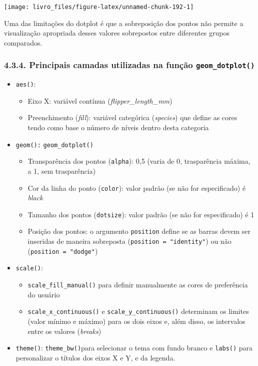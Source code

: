 \documentclass[
]{book}
\begin{document}
\begin{center}\texttt{[image: livro\_files/figure-latex/unnamed-chunk-192-1]} \end{center}

Uma das limitações do dotplot é que a sobreposição dos pontos não permite a visualização apropriada desses valores sobrepostos entre diferentes grupos comparados.

\hypertarget{principais-camadas-utilizadas-na-funuxe7uxe3o-geom_dotplot}{%
\subsubsection{\texorpdfstring{4.3.4. Principais camadas utilizadas na função \texttt{geom\_dotplot()}}{4.3.4. Principais camadas utilizadas na função geom\_dotplot()}}\label{principais-camadas-utilizadas-na-funuxe7uxe3o-geom_dotplot}}

\begin{itemize}
\item
  \texttt{aes()}:

  \begin{itemize}
  \item
    Eixo X: variável contínua (\emph{flipper\_length\_mm})
  \item
    Preenchimento (\emph{fill}): variável categórica (\emph{species}) que define as cores tendo como base o número de níveis dentro desta categoria
  \end{itemize}
\item
  \texttt{geom():} \texttt{geom\_dotplot()}

  \begin{itemize}
  \item
    Transparência dos pontos (\texttt{alpha}): 0,5 (varia de 0, trasparência máxima, a 1, sem trasparência)
  \item
    Cor da linha do ponto (\texttt{color}): valor padrão (se não for especificado) é \emph{black}
  \item
    Tamanho dos pontos (\texttt{dotsize}): valor padrão (se não for especificado) é 1
  \item
    Posição dos pontos: o argumento \texttt{position} define se as barras devem ser inseridas de maneira sobreposta (\texttt{position\ =\ "identity"}) ou não (\texttt{position\ =\ "dodge"})
  \end{itemize}
\item
  \texttt{scale()}:

  \begin{itemize}
  \item
    \texttt{scale\_fill\_manual()} para definir manualmente as cores de preferência do usuário
  \item
    \texttt{scale\_x\_continuous()} e \texttt{scale\_y\_continuous()} determinam os limites (valor mínimo e máximo) para os dois eixos e, além disso, os intervalos entre os valores (\emph{breaks})
  \end{itemize}
\item
  \texttt{theme()}: \texttt{theme\_bw()}para selecionar o tema com fundo branco e \texttt{labs()} para personalizar o títulos dos eixos X e Y, e da legenda.
\end{itemize}
\end{document}
